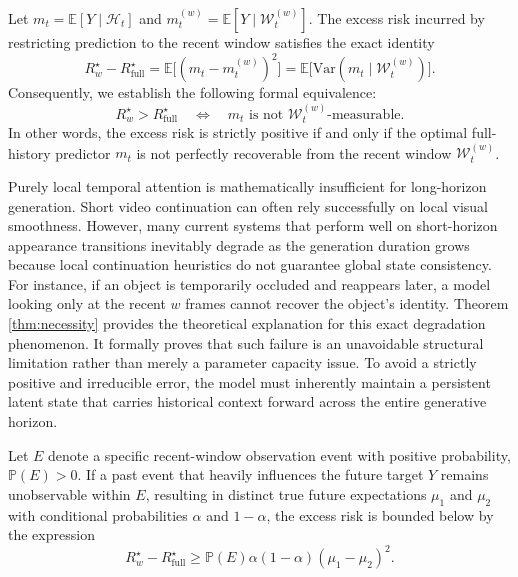 \begin{theorem}
\label{thm:necessity}
Let $m_t = \mathbb{E}[Y\mid \mathcal{H}_t]$ and $m_t^{(w)} = \mathbb{E}[Y\mid \mathcal{W}_t^{(w)}]$. The excess risk incurred by restricting prediction to the recent window satisfies the exact identity
\begin{equation}
R_{w}^\star - R_{\mathrm{full}}^\star = \mathbb{E}\bigl[(m_t - m_t^{(w)})^2\bigr] = \mathbb{E}\bigl[\mathrm{Var}(m_t\mid \mathcal{W}_t^{(w)})\bigr].
\end{equation}
Consequently, we establish the following formal equivalence:
\begin{equation}
R_{w}^\star > R_{\mathrm{full}}^\star
\quad\Longleftrightarrow\quad
m_t \text{ is not } \mathcal{W}_t^{(w)}\text{-measurable}.
\label{eq:iff_nonmeasurable}
\end{equation}
In other words, the excess risk is strictly positive if and only if the optimal full-history predictor $m_t$ is not perfectly recoverable from the recent window $\mathcal{W}_t^{(w)}$.
\end{theorem}


\begin{remark}
\normalfont Purely local temporal attention is mathematically insufficient for long-horizon generation. Short video continuation can often rely successfully on local visual smoothness. However, many current systems that perform well on short-horizon appearance transitions inevitably degrade as the generation duration grows because local continuation heuristics do not guarantee global state consistency. For instance, if an object is temporarily occluded and reappears later, a model looking only at the recent $w$ frames cannot recover the object's identity. Theorem \ref{thm:necessity} provides the theoretical explanation for this exact degradation phenomenon. It formally proves that such failure is an unavoidable structural limitation rather than merely a parameter capacity issue. To avoid a strictly positive and irreducible error, the model must inherently maintain a persistent latent state that carries historical context forward across the entire generative horizon.
\end{remark}


\begin{corollary}
\label{cor:lower_bound}
Let $E$ denote a specific recent-window observation event with positive probability, $\mathbb{P}(E)>0$. If a past event that heavily influences the future target $Y$ remains unobservable within $E$, resulting in distinct true future expectations $\mu_1$ and $\mu_2$ with conditional probabilities $\alpha$ and $1-\alpha$, the excess risk is bounded below by the expression
\begin{equation}
R_{w}^\star - R_{\mathrm{full}}^\star \ge \mathbb{P}(E)\alpha(1-\alpha)(\mu_1-\mu_2)^2.
\end{equation}
\end{corollary}


